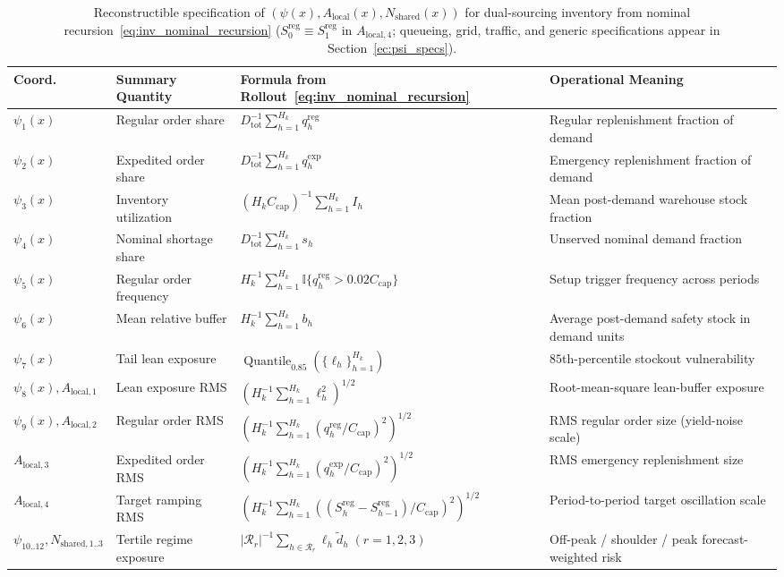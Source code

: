 \begin{table}[htbp]
\centering
\caption{Reconstructible specification of $(\psi(x), A_{\mathrm{local}}(x), N_{\mathrm{shared}}(x))$ for dual-sourcing inventory from nominal recursion~\eqref{eq:inv_nominal_recursion} ($S_0^{\mathrm{reg}} \equiv S_1^{\mathrm{reg}}$ in $A_{\mathrm{local},4}$; queueing, grid, traffic, and generic specifications appear in Section~\ref*{ec:psi_specs}).}\label{tab:psi_inventory}
\scriptsize
\setlength{\tabcolsep}{4.8pt}
\begin{tabular}{llll}
\toprule
\textbf{Coord.} & \textbf{Summary Quantity} & \textbf{Formula from Rollout~\eqref{eq:inv_nominal_recursion}} & \textbf{Operational Meaning} \\
\midrule
$\psi_1(x)$ & Regular order share & $D_{\mathrm{tot}}^{-1}\sum_{h=1}^{H_k} q_h^{\mathrm{reg}}$ & Regular replenishment fraction of demand \\
$\psi_2(x)$ & Expedited order share & $D_{\mathrm{tot}}^{-1}\sum_{h=1}^{H_k} q_h^{\mathrm{exp}}$ & Emergency replenishment fraction of demand \\
$\psi_3(x)$ & Inventory utilization & $(H_k C_{\mathrm{cap}})^{-1}\sum_{h=1}^{H_k} I_h$ & Mean post-demand warehouse stock fraction \\
$\psi_4(x)$ & Nominal shortage share & $D_{\mathrm{tot}}^{-1}\sum_{h=1}^{H_k} s_h$ & Unserved nominal demand fraction \\
$\psi_5(x)$ & Regular order frequency & $H_k^{-1}\sum_{h=1}^{H_k} \mathbb{I}\{q_h^{\mathrm{reg}} > 0.02 C_{\mathrm{cap}}\}$ & Setup trigger frequency across periods \\
$\psi_6(x)$ & Mean relative buffer & $H_k^{-1}\sum_{h=1}^{H_k} b_h$ & Average post-demand safety stock in demand units \\
$\psi_7(x)$ & Tail lean exposure & $\operatorname{Quantile}_{0.85}(\{\ell_h\}_{h=1}^{H_k})$ & $85$th-percentile stockout vulnerability \\
$\psi_8(x), A_{\mathrm{local},1}$ & Lean exposure RMS & $(H_k^{-1}\sum_{h=1}^{H_k} \ell_h^2)^{1/2}$ & Root-mean-square lean-buffer exposure \\
$\psi_9(x), A_{\mathrm{local},2}$ & Regular order RMS & $(H_k^{-1}\sum_{h=1}^{H_k} (q_h^{\mathrm{reg}}/C_{\mathrm{cap}})^2)^{1/2}$ & RMS regular order size (yield-noise scale) \\
$A_{\mathrm{local},3}$ & Expedited order RMS & $(H_k^{-1}\sum_{h=1}^{H_k} (q_h^{\mathrm{exp}}/C_{\mathrm{cap}})^2)^{1/2}$ & RMS emergency replenishment size \\
$A_{\mathrm{local},4}$ & Target ramping RMS & $(H_k^{-1}\sum_{h=1}^{H_k} ((S_h^{\mathrm{reg}}\!-\!S_{h-1}^{\mathrm{reg}})/C_{\mathrm{cap}})^2)^{1/2}$ & Period-to-period target oscillation scale \\
$\psi_{10..12}, N_{\mathrm{shared},1..3}$ & Tertile regime exposure & $|\mathcal{R}_r|^{-1}\sum_{h \in \mathcal{R}_r} \ell_h \tilde{d}_h \; (r = 1, 2, 3)$ & Off-peak / shoulder / peak forecast-weighted risk \\
\bottomrule
\end{tabular}
\end{table}

